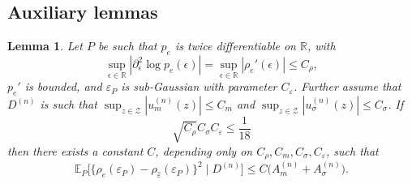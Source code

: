 \documentclass[aos]{imsart}
\newcommand{\R}{\mathbb{R}}
\newcommand{\E}{\mathbb{E}}
\newtheorem{lemma}[theorem]{Lemma}
\begin{document}
	\subsection{Auxiliary lemmas}
	
	
	\begin{lemma}
		\label{lem:estimatedresidualscore}
		Let $P$ be such that $ p_{e}$ is twice differentiable on $\R$, with \begin{equation*}
			\sup_{\epsilon\in\R} |\partial_\epsilon^2 \log p_{e}(\epsilon)| = \sup_{\epsilon\in\R} |\rho_{e}'(\epsilon)|\leq C_\rho,
		\end{equation*}
		$p_{e}'$ is bounded, and $\varepsilon_P$ is sub-Gaussian with parameter $C_\varepsilon$. Further assume that $D^{(n)}$ is such that  $\sup_{z\in\mathcal{Z}} |u_m^{(n)}(z)|\leq C_m$  and $\sup_{z\in\mathcal{Z}} |u_\sigma^{(n)}(z)|\leq C_\sigma$. If
		\begin{equation*}
			\sqrt{C_\rho}C_\sigma C_\varepsilon \leq \frac1{18}
		\end{equation*}
		then there exists a constant $C$, depending only on $C_\rho, C_m, C_\sigma, C_\varepsilon$, such that
		\begin{equation*}
			\E_P\Big[\big\{\rho_{e}(\varepsilon_P)-\rho_{\hat\varepsilon}(\varepsilon_P)\big\}^2 \; \Big| \; D^{(n)}\Big] \leq C \big(A_m^{(n)} + A_\sigma^{(n)}\big).
		\end{equation*}
	\end{lemma}
\end{document}
